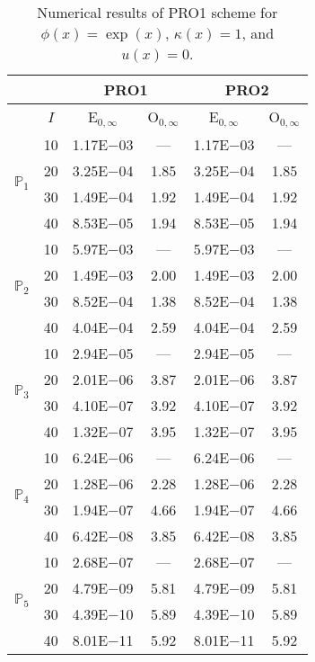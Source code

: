 \begin{table}[H]
\caption{Numerical results of PRO1 scheme for $\phi(x)=\exp(x)$, $\kappa(x)=1$, and $u(x)=0$.}
\setlength{\tabcolsep}{5pt}
\centering
\begin{tabular}{@{}l c c c c c@{}}
\toprule
 &  & \multicolumn{2}{c}{PRO1} & \multicolumn{2}{c}{PRO2}\\
\midrule
 & $I$ & E$_{0,\infty}$ & O$_{0,\infty}$ & E$_{0,\infty}$ & O$_{0,\infty}$\\
\midrule
\multirow{4}{*}{$\mathbb{P}_{1}$}
 & 10 & 1.17E$-$03 & --- & 1.17E$-$03 & ---\\
 & 20 & 3.25E$-$04 & 1.85 & 3.25E$-$04 & 1.85 \\
 & 30 & 1.49E$-$04 & 1.92 & 1.49E$-$04 & 1.92 \\
 & 40 & 8.53E$-$05 & 1.94 & 8.53E$-$05 & 1.94 \\
\midrule
\multirow{4}{*}{$\mathbb{P}_{2}$}
 & 10 & 5.97E$-$03 & --- & 5.97E$-$03 & ---\\
 & 20 & 1.49E$-$03 & 2.00 & 1.49E$-$03 & 2.00 \\
 & 30 & 8.52E$-$04 & 1.38 & 8.52E$-$04 & 1.38 \\
 & 40 & 4.04E$-$04 & 2.59 & 4.04E$-$04 & 2.59 \\
\midrule
\multirow{4}{*}{$\mathbb{P}_{3}$}
 & 10 & 2.94E$-$05 & --- & 2.94E$-$05 & ---\\
 & 20 & 2.01E$-$06 & 3.87 & 2.01E$-$06 & 3.87 \\
 & 30 & 4.10E$-$07 & 3.92 & 4.10E$-$07 & 3.92 \\
 & 40 & 1.32E$-$07 & 3.95 & 1.32E$-$07 & 3.95 \\
\midrule
\multirow{4}{*}{$\mathbb{P}_{4}$}
 & 10 & 6.24E$-$06 & --- & 6.24E$-$06 & ---\\
 & 20 & 1.28E$-$06 & 2.28 & 1.28E$-$06 & 2.28 \\
 & 30 & 1.94E$-$07 & 4.66 & 1.94E$-$07 & 4.66 \\
 & 40 & 6.42E$-$08 & 3.85 & 6.42E$-$08 & 3.85 \\
\midrule
\multirow{4}{*}{$\mathbb{P}_{5}$}
 & 10 & 2.68E$-$07 & --- & 2.68E$-$07 & ---\\
 & 20 & 4.79E$-$09 & 5.81 & 4.79E$-$09 & 5.81 \\
 & 30 & 4.39E$-$10 & 5.89 & 4.39E$-$10 & 5.89 \\
 & 40 & 8.01E$-$11 & 5.92 & 8.01E$-$11 & 5.92 \\
\bottomrule
\end{tabular}
\label{Table:PRO:Test1}
\end{table}
